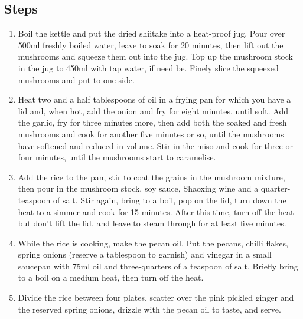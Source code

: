 \documentclass{book}
\begin{document}
\subsection*{Steps}
\begin{enumerate}
\item Boil the kettle and put the dried shiitake into a heat-proof jug. Pour over 500ml freshly boiled water, leave to soak for 20 minutes, then lift out the mushrooms and squeeze them out into the jug. Top up the mushroom stock in the jug to 450ml with tap water, if need be. Finely slice the squeezed mushrooms and put to one side.
\item Heat two and a half tablespoons of oil in a frying pan for which you have a lid and, when hot, add the onion and fry for eight minutes, until soft. Add the garlic, fry for three minutes more, then add both the soaked and fresh mushrooms and cook for another five minutes or so, until the mushrooms have softened and reduced in volume. Stir in the miso and cook for three or four minutes, until the mushrooms start to caramelise.
\item Add the rice to the pan, stir to coat the grains in the mushroom mixture, then pour in the mushroom stock, soy sauce, Shaoxing wine and a quarter-teaspoon of salt. Stir again, bring to a boil, pop on the lid, turn down the heat to a simmer and cook for 15 minutes. After this time, turn off the heat but don’t lift the lid, and leave to steam through for at least five minutes.
\item While the rice is cooking, make the pecan oil. Put the pecans, chilli flakes, spring onions (reserve a tablespoon to garnish) and vinegar in a small saucepan with 75ml oil and three-quarters of a teaspoon of salt. Briefly bring to a boil on a medium heat, then turn off the heat.
\item Divide the rice between four plates, scatter over the pink pickled ginger and the reserved spring onions, drizzle with the pecan oil to taste, and serve.
\end{enumerate}
\newpage
\end{document}
